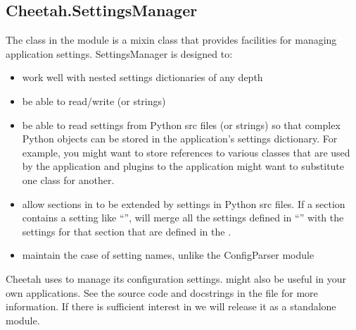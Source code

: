 \subsection{Cheetah.SettingsManager}
\label{libraries.SettingsManager}

The  class in the  module is
a mixin class that provides facilities for managing application settings.  
SettingsManager is designed to:
\begin{itemize}
\item work well with nested settings dictionaries of any depth
\item be able to read/write  (or strings)
\item be able to read settings from Python src files (or strings) so that
     complex Python objects can be stored in the application's settings
     dictionary.  For example, you might want to store references to various
     classes that are used by the application and plugins to the application
     might want to substitute one class for another.
\item allow sections in  to be extended by settings in
     Python src files.  If a section contains a setting like
     ``'',  will merge
     all the settings defined in ``'' with the settings for
     that section that are defined in the .
\item maintain the case of setting names, unlike the ConfigParser module
\end{itemize}

Cheetah uses  to manage its configuration settings.
 might also be useful in your own applications. See the
source code and docstrings in the file  for more
information. If there is sufficient interest in  we will
release it as a standalone module.


